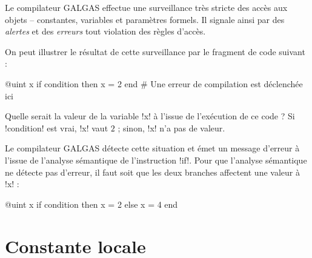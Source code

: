 
Le compilateur GALGAS effectue une surveillance très stricte des accès aux objets -- constantes, variables et paramètres formels. Il signale ainsi par des \emph{alertes} et des \emph{erreurs} tout violation des règles d'accès.

On peut illustrer le résultat de cette surveillance par le fragment de code suivant :
\begin{galgas}
@uint x
if condition then
  x = 2
end # Une erreur de compilation est déclenchée ici
\end{galgas}

Quelle serait la valeur de la variable \ggs!x! à l'issue de l'exécution de ce code ? Si \ggs!condition! est vrai, \ggs!x! vaut $2$ ; sinon, \ggs!x! n'a pas de valeur.

Le compilateur GALGAS détecte cette situation et émet un message d'erreur à l'issue de l'analyse sémantique de l'instruction \ggs!if!. Pour que l'analyse sémantique ne détecte pas d'erreur, il faut soit que les deux branches affectent une valeur à \ggs!x! :

\begin{galgas}
@uint x
if condition then
  x = 2
else
  x = 4
end
\end{galgas}












\section{Constante locale}

